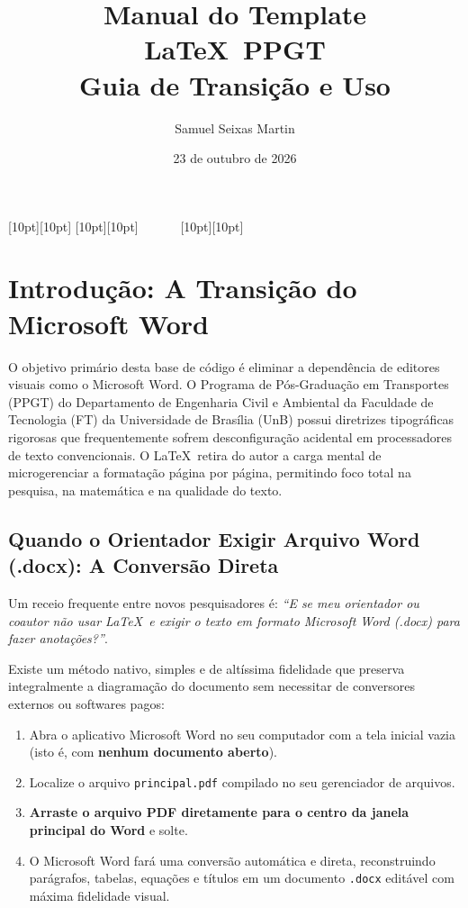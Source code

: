 \documentclass[12pt, a4paper]{article}
\title{Manual do Template \LaTeX \ PPGT \\ Guia de Transição e Uso}
\author{Samuel Seixas Martin}
\date{23 de outubro de 2026}
\newcommand{\ornamento}{
\noindent
    \parbox{\textwidth}{%
        {\color{BrickRed}\raisebox{-2.1pt}[10pt][10pt]{\leafright} \hrulefill \raisebox{-2.1pt}[10pt][10pt]{~~~\decofourleft \decotwo\decofourright~~~} \hrulefill \raisebox{-2.1pt}[10pt][10pt]{ \leafleft}}
    }%
}
\begin{document}
\maketitle
\ornamento
\tableofcontents
\vspace{0.5cm}

\section{Introdução: A Transição do Microsoft Word}

\lettrine{O}{} objetivo primário desta base de código é eliminar a dependência de editores visuais como o Microsoft Word. O Programa de Pós-Graduação em Transportes (PPGT) do Departamento de Engenharia Civil e Ambiental da Faculdade de Tecnologia (FT) da Universidade de Brasília (UnB) possui diretrizes tipográficas rigorosas que frequentemente sofrem desconfiguração acidental em processadores de texto convencionais. O \LaTeX \ retira do autor a carga mental de microgerenciar a formatação página por página, permitindo foco total na pesquisa, na matemática e na qualidade do texto.

\subsection{Quando o Orientador Exigir Arquivo Word (.docx): A Conversão Direta}

Um receio frequente entre novos pesquisadores é: \textit{``E se meu orientador ou coautor não usar \LaTeX\ e exigir o texto em formato Microsoft Word (.docx) para fazer anotações?''}.

Existe um método nativo, simples e de altíssima fidelidade que preserva integralmente a diagramação do documento sem necessitar de conversores externos ou softwares pagos:

\begin{enumerate}
    \item Abra o aplicativo Microsoft Word no seu computador com a tela inicial vazia (isto é, com \textbf{nenhum documento aberto}).
    \item Localize o arquivo \texttt{principal.pdf} compilado no seu gerenciador de arquivos.
    \item \textbf{Arraste o arquivo PDF diretamente para o centro da janela principal do Word} e solte.
    \item O Microsoft Word fará uma conversão automática e direta, reconstruindo parágrafos, tabelas, equações e títulos em um documento \texttt{.docx} editável com máxima fidelidade visual.
\end{enumerate}
\end{document}

